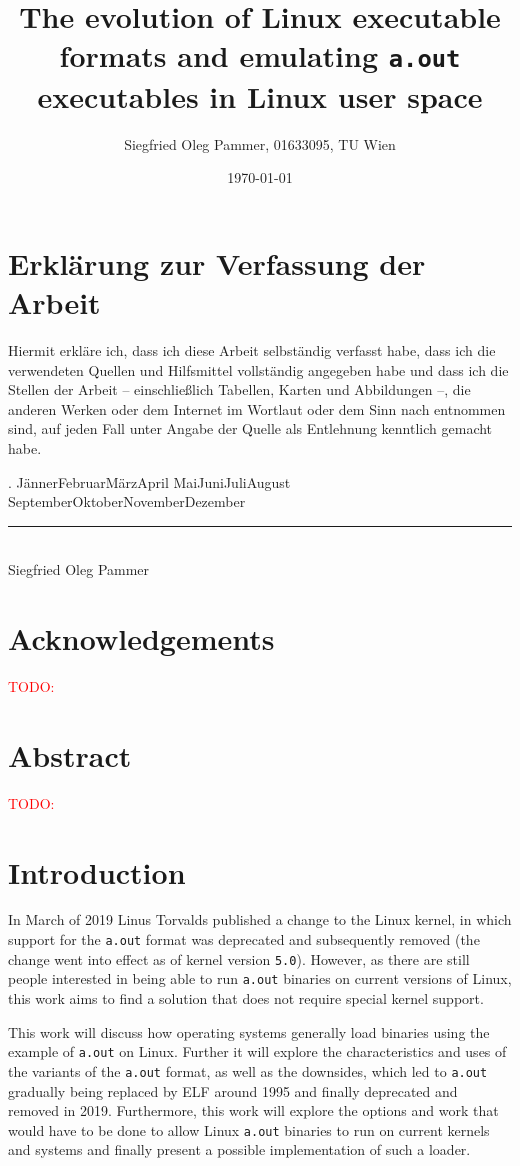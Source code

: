 \documentclass{article}
\title{The evolution of Linux executable formats and emulating \texttt{a.out} executables in Linux user space}
\author{Siegfried Oleg Pammer, 01633095, TU Wien}
\date{\today}
\newcommand{\todo}[1]{\textcolor{red}{TODO: #1}}
\newcommand{\monthword}[1]{\ifcase#1\or Jänner\or Februar\or März\or April\or
                                        Mai\or Juni\or Juli\or August\or
                                        September\or Oktober\or November\or Dezember\fi}
\begin{document}
\maketitle

\section*{Erklärung zur Verfassung der Arbeit}
Hiermit erkläre ich, dass ich diese Arbeit selbständig verfasst habe, dass ich die verwendeten Quellen und Hilfsmittel vollständig angegeben habe und dass ich die Stellen der Arbeit – einschließlich Tabellen, Karten und Abbildungen –, die anderen Werken oder dem Internet im Wortlaut oder dem Sinn nach entnommen sind, auf jeden Fall unter Angabe der Quelle als Entlehnung kenntlich gemacht habe.

\vspace{1cm}
\noindent
\begin{flushleft}
\the\day. \monthword{\the\month} \the\year
\end{flushleft}
\begin{flushright}\rule{5cm}{0.4pt}\\Siegfried Oleg Pammer\end{flushright}


\section*{Acknowledgements}
\todo{}

\section*{Abstract}
\label{abstract}
\todo{}

\newpage
\section{Introduction}
\label{intro}

In March of 2019 Linus Torvalds published a change \cite{PhoronixNews} \cite{LinuxKernelGitMsg} to the Linux kernel, in which support for the \texttt{a.out} format was deprecated and subsequently removed (the change went into effect as of kernel version \texttt{5.0}). However, as there are still people interested in being able to run \texttt{a.out} binaries on current versions of Linux, this work aims to find a solution that does not require special kernel support.

This work will discuss how operating systems generally load binaries using the example of \texttt{a.out} on Linux. Further it will explore the characteristics and uses of the variants of the \texttt{a.out} format, as well as the downsides, which led to \texttt{a.out} gradually being replaced by ELF around 1995 and finally deprecated and removed in 2019. Furthermore, this work will explore the options and work that would have to be done to allow Linux \texttt{a.out} binaries to run on current kernels and systems and finally present a possible implementation of such a loader.
\end{document}
